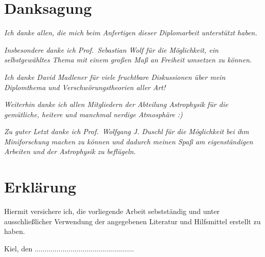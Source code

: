 \documentclass[
	12pt,
	a4paper,
	pagesize=auto,
	DIV=10,
	parskip=half,
	titlepage,
	twoside,
	listof=totoc,
	bibliography=totocnumbered,
	final%
]{scrbook}
\begin{document}
	\mdqoff
	
	
	\mdqon
	\chapter{Danksagung}
	{\centering\Large
	\textsl{Ich danke allen, die mich beim Anfertigen dieser Diplomarbeit unterstützt haben.}
	
	\vspace{1em}
	\textsl{Insbesondere danke ich Prof.~Sebastian Wolf für die Möglichkeit, ein selbstgewähltes Thema mit einem großen Maß an Freiheit umsetzen zu können.}

	\vspace{1em}
	\textsl{Ich danke David Madlener für viele fruchtbare Diskussionen über mein Diplomthema und Verschwörungstheorien aller Art!}

	\vspace{1em}
	\textsl{Weiterhin danke ich allen Mitgliedern der Abteilung Astrophysik für die gemütliche, heitere und manchmal nerdige Atmosphäre :)}

	\vspace{1em}
	\textsl{Zu guter Letzt danke ich Prof.~Wolfgang J. Duschl für die Möglichkeit bei ihm Miniforschung machen zu können und dadurch meinen Spaß am eigenständigen Arbeiten und der Astrophysik zu beflügeln.}\vfill\par}	
	\chapter{Erklärung}
	Hiermit versichere ich, die vorliegende Arbeit sebstständig und unter ausschließlicher Verwendung der angegebenen Literatur und Hilfsmittel erstellt zu haben.
	
	\vspace{4em}
	\hfill Kiel, den .........................\hspace{3cm}.........................\hfill\hfill
	
\end{document}
